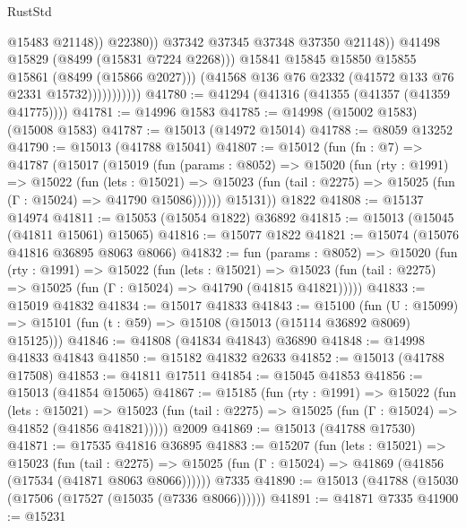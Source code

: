\begin{lexlean}{RustStd}
\begin{coremodule}
                                      @15483
                                      @21148))
                                  @22380))
                              @37342
                              @37345
                              @37348
                              @37350
                              @21148))
                          @41498
                          @15829
                          (@8499 (@15831 @7224 @2268)))
                        @15841
                        @15845
                        @15850
                        @15855
                        @15861
                        (@8499 (@15866 @2027)))
                      (@41568 @136 @76 @2332 (@41572 @133 @76 @2331 @15732)))))))))))
@41780 := @41294 (@41316 (@41355 (@41357 (@41359 @41775))))
@41781 := @14996 @1583
@41785 := @14998 (@15002 @1583) (@15008 @1583)
@41787 := @15013 (@14972 @15014)
@41788 := @8059 @13252
@41790 := @15013 (@41788 @15041)
@41807 := @15012
    (fun (fn : @7) =>
    @41787
      (@15017
        (@15019
          (fun (params : @8052) =>
          @15020
            (fun (rty : @1991) =>
            @15022
              (fun (lets : @15021) =>
              @15023 (fun (tail : @2275) => @15025 (fun (Γ : @15024) => @41790 @15086))))))
        @15131))
    @1822
@41808 := @15137 @14974
@41811 := @15053 (@15054 @1822) @36892
@41815 := @15013 (@15045 (@41811 @15061) @15065)
@41816 := @15077 @1822
@41821 := @15074 (@15076 @41816 @36895 @8063 @8066)
@41832 := fun (params : @8052) =>
  @15020
    (fun (rty : @1991) =>
    @15022
      (fun (lets : @15021) =>
      @15023 (fun (tail : @2275) => @15025 (fun (Γ : @15024) => @41790 (@41815 @41821)))))
@41833 := @15019 @41832
@41834 := @15017 @41833
@41843 := @15100
    (fun (U : @15099) => @15101 (fun (t : @59) => @15108 (@15013 (@15114 @36892 @8069) @15125)))
@41846 := @41808 (@41834 @41843) @36890
@41848 := @14998 @41833 @41843
@41850 := @15182 @41832 @2633
@41852 := @15013 (@41788 @17508)
@41853 := @41811 @17511
@41854 := @15045 @41853
@41856 := @15013 (@41854 @15065)
@41867 := @15185
    (fun (rty : @1991) =>
    @15022
      (fun (lets : @15021) =>
      @15023 (fun (tail : @2275) => @15025 (fun (Γ : @15024) => @41852 (@41856 @41821)))))
    @2009
@41869 := @15013 (@41788 @17530)
@41871 := @17535 @41816 @36895
@41883 := @15207
    (fun (lets : @15021) =>
    @15023
      (fun (tail : @2275) =>
      @15025 (fun (Γ : @15024) => @41869 (@41856 (@17534 (@41871 @8063 @8066))))))
    @7335
@41890 := @15013 (@41788 (@15030 (@17506 (@17527 (@15035 (@7336 @8066))))))
@41891 := @41871 @7335
@41900 := @15231

\end{coremodule}
\end{lexlean}

